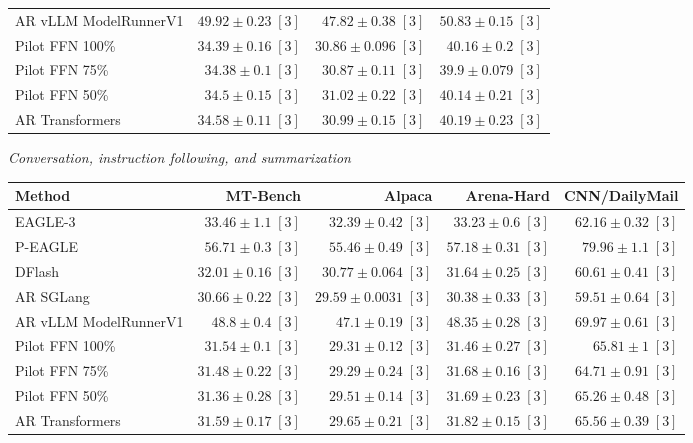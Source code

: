 \documentclass[conference,onecolumn]{IEEEtran}
\begin{document}
\begin{table}[!htp]
\begin{tabular}{@{}>{\raggedright\arraybackslash}p{3.7cm}rrr@{}}
AR \textperiodcentered{} vLLM ModelRunnerV1 & \(49.92 \pm 0.23\;[3]\) & \(47.82 \pm 0.38\;[3]\) & \(50.83 \pm 0.15\;[3]\) \\
Pilot FFN 100\% & \(34.39 \pm 0.16\;[3]\) & \(30.86 \pm 0.096\;[3]\) & \(40.16 \pm 0.2\;[3]\) \\
Pilot FFN 75\% & \(34.38 \pm 0.1\;[3]\) & \(30.87 \pm 0.11\;[3]\) & \(39.9 \pm 0.079\;[3]\) \\
Pilot FFN 50\% & \(34.5 \pm 0.15\;[3]\) & \(31.02 \pm 0.22\;[3]\) & \(40.14 \pm 0.21\;[3]\) \\
AR \textperiodcentered{} Transformers & \(34.58 \pm 0.11\;[3]\) & \(30.99 \pm 0.15\;[3]\) & \(40.19 \pm 0.23\;[3]\) \\
\bottomrule
\end{tabular}\par\medskip
\textit{Conversation, instruction following, and summarization}\par\smallskip
\begin{tabular}{@{}>{\raggedright\arraybackslash}p{3.7cm}rrrr@{}}
\toprule
Method & MT-Bench & Alpaca & Arena-Hard & CNN/DailyMail \\
\midrule
EAGLE-3 & \(33.46 \pm 1.1\;[3]\) & \(32.39 \pm 0.42\;[3]\) & \(33.23 \pm 0.6\;[3]\) & \(62.16 \pm 0.32\;[3]\) \\
P-EAGLE & \(56.71 \pm 0.3\;[3]\) & \(55.46 \pm 0.49\;[3]\) & \(57.18 \pm 0.31\;[3]\) & \(79.96 \pm 1.1\;[3]\) \\
DFlash & \(32.01 \pm 0.16\;[3]\) & \(30.77 \pm 0.064\;[3]\) & \(31.64 \pm 0.25\;[3]\) & \(60.61 \pm 0.41\;[3]\) \\
AR \textperiodcentered{} SGLang & \(\mathbf{30.66} \pm 0.22\;[3]\) & \(29.59 \pm 0.0031\;[3]\) & \(\mathbf{30.38} \pm 0.33\;[3]\) & \(\mathbf{59.51} \pm 0.64\;[3]\) \\
AR \textperiodcentered{} vLLM ModelRunnerV1 & \(48.8 \pm 0.4\;[3]\) & \(47.1 \pm 0.19\;[3]\) & \(48.35 \pm 0.28\;[3]\) & \(69.97 \pm 0.61\;[3]\) \\
Pilot FFN 100\% & \(31.54 \pm 0.1\;[3]\) & \(29.31 \pm 0.12\;[3]\) & \(31.46 \pm 0.27\;[3]\) & \(65.81 \pm 1\;[3]\) \\
Pilot FFN 75\% & \(31.48 \pm 0.22\;[3]\) & \(\mathbf{29.29} \pm 0.24\;[3]\) & \(31.68 \pm 0.16\;[3]\) & \(64.71 \pm 0.91\;[3]\) \\
Pilot FFN 50\% & \(31.36 \pm 0.28\;[3]\) & \(29.51 \pm 0.14\;[3]\) & \(31.69 \pm 0.23\;[3]\) & \(65.26 \pm 0.48\;[3]\) \\
AR \textperiodcentered{} Transformers & \(31.59 \pm 0.17\;[3]\) & \(29.65 \pm 0.21\;[3]\) & \(31.82 \pm 0.15\;[3]\) & \(65.56 \pm 0.39\;[3]\) \\

\end{tabular}
\end{table}
\end{document}
